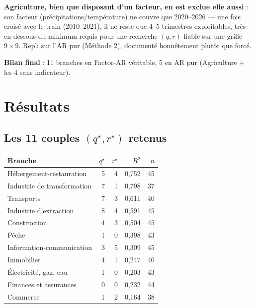 \documentclass[11pt,a4paper]{article}
\begin{document}
\begin{alertebox}
\textbf{Agriculture, bien que disposant d'un facteur, en est exclue elle aussi} : son facteur (précipitations/température) ne couvre que 2020--2026 --- une fois croisé avec le train (2010--2021), il ne reste que 4--5 trimestres exploitables, très en dessous du minimum requis pour une recherche $(q,r)$ fiable sur une grille $9\times9$. Repli sur l'AR pur (Méthode 2), documenté honnêtement plutôt que forcé.
\end{alertebox}

\textbf{Bilan final} : 11 branches en Factor-AR véritable, 5 en AR pur (Agriculture + les 4 sans indicateur).

\section{Résultats}

\subsection{Les 11 couples $(q^\star,r^\star)$ retenus}

\begin{center}
\small
\begin{tabular}{lrrrr}
\toprule
\textbf{Branche} & \textbf{$q^\star$} & \textbf{$r^\star$} & \textbf{$R^2$} & \textbf{$n$} \\
\midrule
Hébergement-restauration & 5 & 4 & 0,752 & 45 \\
Industrie de transformation & 7 & 1 & 0,798 & 37 \\
Transports & 7 & 3 & 0,611 & 40 \\
Industrie d'extraction & 8 & 4 & 0,591 & 45 \\
Construction & 4 & 3 & 0,504 & 45 \\
Pêche & 1 & 0 & 0,398 & 43 \\
Information-communication & 3 & 5 & 0,309 & 45 \\
Immobilier & 4 & 1 & 0,247 & 40 \\
Électricité, gaz, eau & 1 & 0 & 0,203 & 43 \\
Finances et assurances & 0 & 0 & 0,232 & 44 \\
Commerce & 1 & 2 & 0,164 & 38 \\
\bottomrule
\end{tabular}
\end{center}
\end{document}
